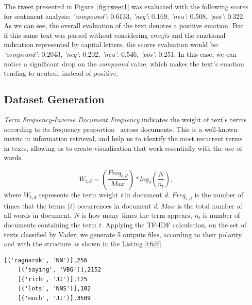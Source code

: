 The tweet presented in Figure~\ref{fig:tweet1} was evaluated with the following scores for sentiment analysis: \textit{'compound'}: 0.6133, \textit{'neg'}: 0.169, \textit{'neu'}: 0.508, \textit{'pos'}: 0.322. As we can see, the overall evaluation of the text denotes a positive emotion. But if this same text was parsed without considering \textit{emojis} and the emotional indication represented by capital letters, 
the scores evaluation would be: \textit{'compound'}: 0.2043, \textit{'neg'}: 0.202, \textit{'neu'}: 0.546, \textit{'pos'}: 0.251. In this case, we can notice a significant drop on the \textit{compound} value, which makes the text's emotion tending to neutral, instead of positive.%


\subsection{Dataset Generation}
\label{sec:DataGeneration}

\textit{Term Frequency-Inverse Document Frequency} indicates the weight of text's terms according to its frequency proportion~\cite{Dipanjan:2016} across documents. This is a well-known metric in information retrieval, and help us to identify the most recurrent terms in texts, allowing us to create visualization that work essentially with the use of words.

\begin{equation*}
    W_{t,d} = \left ( \frac{Freq_{t,d}}{Max} \right ) * log_2 \left ( \frac{N}{n_t} \right),
\end{equation*}
where \( W_{t,d}\) represents the term weight \textit{t} in document \textit{d}. 
\( Freq_{t,d}\) is the number of times that the terms ($t$) occurrences in document \textit{d}. 
\( Max\) is the total number of all words in document. 
\( N \) is how many times the term appears, \( n_t \) is number of documents containing the term \( t \). Applying the TF-IDF calculation, on the set of texts classified by Vader, we generate 5 outputs files, according to their polarity and with the structure as shown in the Listing \ref{tfidf}.

\begin{lstlisting}[label=tfidf,caption=TF-IDF File Structure,float,frame=tb]
    [('ragnarok', 'NN')],256
    [('saying', 'VBG')],2152
    [('rich', 'JJ')],125
    [('lots', 'NNS')],102
    [('much', 'JJ')],3509
\end{lstlisting}


